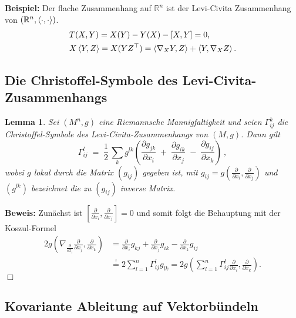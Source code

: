 \documentclass[12pt,a4paper]{article}
\def\R{\mathbb{R}}
\newtheorem{Lemma}{Lemma}[section]
\def\proof{\noindent\textbf{Beweis:}\quad}
\def\qed{\quad\hfill\ensuremath{\Box}}
\begin{document}
\bigskip

{\bf Beispiel:} Der flache Zusammenhang auf $\R^n$ ist der Levi-Civita
Zusammenhang von $(\R^n,\scp{\cdot,\cdot})$.
\begin{align*}
&T(X,Y) = X(Y) - Y(X) - [X,Y] = 0,\\
&X\left\langle Y,Z\right\rangle = X(Y Z^\top) = \left\langle\nabla_X Y, Z\right\rangle + \left\langle Y,\nabla_X Z\right\rangle.
\end{align*}

\bigskip

\subsection{Die Christoffel-Symbole des Levi-Civita-Zusammenhangs}

\bigskip

\begin{Lemma}
Sei $(M^n,g)$ eine Riemannsche Mannigfaltigkeit und seien $\Gamma^k_{ij}$
die Christoffel-Symbole des Levi-Civita-Zusammenhangs von $(M,g)$. Dann gilt
$$
\Gamma^l_{ij} 
\;=\;
\frac12 \, \sum_{k} g^{lk} 
\left(
 \frac{\partial  g_{jk}}{\partial x_i} \;+\; \frac{\partial
 g_{ik}}{\partial x_j} \;-\;
 \frac{\partial g_{ij}}{\partial x_k}   
\right) \ ,
$$ 
wobei $g$ lokal durch die Matrix $(g_{ij})$ gegeben ist, mit 
$g_{ij} = g( \tfrac{\partial }{\partial x_i} ,  \tfrac{\partial }{\partial x_j} )$
und $(g^{lk})$ bezeichnet die zu $(g_{ij})$ inverse Matrix.
\end{Lemma}
\proof
Zun\"achst ist $[\tfrac{\partial }{\partial x_i},\tfrac{\partial}{\partial x_j}] = 0$ 
und somit folgt die Behauptung mit der Koszul-Formel
\begin{align*}
2g\left(\nabla_{\frac{\partial}{\partial x_i}}\frac{\partial}{\partial
x_j},\frac{\partial}{\partial x_k} \right) &= 
\frac{\partial}{\partial x_i} g_{kj} + \frac{\partial}{\partial x_j} g_{ik} -
\frac{\partial}{\partial x_k}g_{ij} \\ &\overset{!}{=}
2 \sum_{l=1}^n \Gamma_{ij}^l g_{lk} = 
2g\left(\sum_{l=1}^n \Gamma_{ij}^l \frac{\partial}{\partial
x_l},\frac{\partial}{\partial x_k} \right).
\end{align*}
\qed

\bigskip


\bigskip

\subsection{Kovariante Ableitung auf Vektorb\"undeln}
\end{document}
